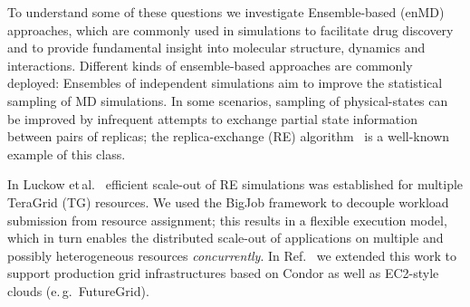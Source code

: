 \documentclass[conference,final]{IEEEtran}
\newcommand{\alnote}[1]{ {\textcolor{blue} { ***AL: #1 }}}
\newcommand{\jhanote}[1]{ {\textcolor{red} { ***SJ: #1 }}}
\newcommand{\alnote}[1]{}
\newcommand{\jhanote}[1]{}
\begin{document}


 





 



To understand some of these questions we investigate Ensemble-based
(enMD) approaches, which are commonly used in simulations to
facilitate drug discovery and to provide fundamental insight into
molecular structure, dynamics and interactions.  Different kinds of
ensemble-based approaches are commonly deployed: Ensembles of
independent simulations aim to improve the statistical sampling of MD
simulations.  In some scenarios, sampling of physical-states can be
improved by infrequent attempts to exchange partial state information
between pairs of replicas; the replica-exchange (RE)
algorithm~\cite{hansmann} is a well-known example of this class.

In Luckow et\,al.~\cite{repex_ptrsb} efficient scale-out of RE
simulations was established for multiple TeraGrid (TG) resources. We
used the BigJob framework to decouple workload submission from
resource assignment; this results in a flexible execution model, which
in turn enables the distributed scale-out of applications on multiple
and possibly heterogeneous resources {\it concurrently}.  In
Ref.~\cite{10.1109/CCGRID.2010.91} we extended this work to support
production grid infrastructures based on Condor as well as EC2-style
clouds (e.\,g.\ FutureGrid).
 
\end{document}
